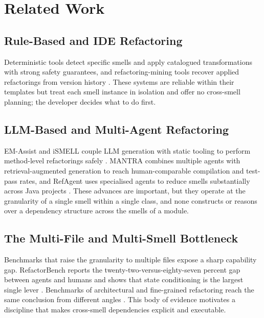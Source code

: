 \documentclass[journal,onecolumn,11pt]{IEEEtran}
\begin{document}
\section{Related Work}
\subsection{Rule-Based and IDE Refactoring}
Deterministic tools detect specific smells and apply catalogued transformations with strong safety guarantees, and refactoring-mining tools recover applied refactorings from version history \cite{tsantalis2011,tsantalis2022}. These systems are reliable within their templates but treat each smell instance in isolation and offer no cross-smell planning; the developer decides what to do first.

\subsection{LLM-Based and Multi-Agent Refactoring}
EM-Assist and iSMELL couple LLM generation with static tooling to perform method-level refactorings safely \cite{pomian2024,wu2024}. MANTRA combines multiple agents with retrieval-augmented generation to reach human-comparable compilation and test-pass rates, and RefAgent uses specialised agents to reduce smells substantially across Java projects \cite{xu2025mantra,oueslati2025}. These advances are important, but they operate at the granularity of a single smell within a single class, and none constructs or reasons over a dependency structure across the smells of a module.

\subsection{The Multi-File and Multi-Smell Bottleneck}
Benchmarks that raise the granularity to multiple files expose a sharp capability gap. RefactorBench reports the twenty-two-versus-eighty-seven percent gap between agents and humans and shows that state conditioning is the largest single lever \cite{gautam2025}. Benchmarks of architectural and fine-grained refactoring reach the same conclusion from different angles \cite{smellbench2026}. This body of evidence motivates a discipline that makes cross-smell dependencies explicit and executable.
\end{document}
